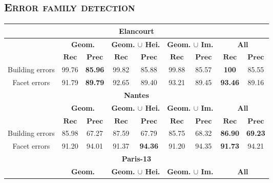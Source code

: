     \subsection{\textsc{Error family detection}}
        \label{subsec::more_experiments::finesse::2}
        \begin{table}[htbp]
            \centering
            \begin{tabular}{|c | c c | c c | c c | c c |}
                \hline
                \multicolumn{9}{|c|}{\textbf{Elancourt}}\\
                \hline
                &\multicolumn{2}{c|}{\textbf{Geom.}} & \multicolumn{2}{c|}{\textbf{Geom. $\cup$ Hei.}} & \multicolumn{2}{c|}{\textbf{Geom. $\cup$ Im.}} & \multicolumn{2}{x{1.8cm}|}{\textbf{All}}\\
                \cline{2-9}
                & $\bm{Rec}$ & $\bm{Prec}$ &  $\bm{Rec}$ & $\bm{Prec}$ &  $\bm{Rec}$ & $\bm{Prec}$ &  $\bm{Rec}$ & $\bm{Prec}$ \\
                \hline
                Building errors & 99.76 & \textbf{85.96} & 99.82 & 85.88 & 99.88 & 85.57 & \textbf{100} & 85.55 \\
                \hline
                Facet errors & 91.79 & \textbf{89.79} & 92.65 & 89.40 & 93.21 & 89.45 & \textbf{93.46} & 89.16 \\
                \hline
                \hline
                \multicolumn{9}{|c|}{\textbf{Nantes}}\\
                \hline
                &\multicolumn{2}{c|}{\textbf{Geom.}} & \multicolumn{2}{c|}{\textbf{Geom. $\cup$ Hei.}} & \multicolumn{2}{c|}{\textbf{Geom. $\cup$ Im.}} & \multicolumn{2}{x{1.8cm}|}{\textbf{All}}\\
                \cline{2-9}
                & $\bm{Rec}$ & $\bm{Prec}$ &  $\bm{Rec}$ & $\bm{Prec}$ &  $\bm{Rec}$ & $\bm{Prec}$ &  $\bm{Rec}$ & $\bm{Prec}$ \\
                \hline
                Building errors & 85.98 & 67.27 & 87.59 & 67.79 & 85.75 & 68.32 & \textbf{86.90} & \textbf{69.23} \\
                \hline
                Facet errors & 91.20 & 94.01 & 91.37 & \textbf{94.36} & 91.20 & 94.35 & \textbf{91.73} & 94.21\\
                \hline
                \hline
                \multicolumn{9}{|c|}{\textbf{Paris-13}}\\
                \hline
                &\multicolumn{2}{c|}{\textbf{Geom.}} & \multicolumn{2}{c|}{\textbf{Geom. $\cup$ Hei.}} & \multicolumn{2}{c|}{\textbf{Geom. $\cup$ Im.}} & \multicolumn{2}{x{1.8cm}|}{\textbf{All}}\\

\end{tabular}
\end{table}
